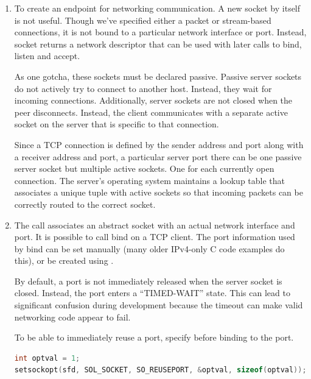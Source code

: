 \begin{enumerate}

  \item {}

  To create an endpoint for networking communication.
  A new socket by itself is not useful.
  Though we've specified either a packet or stream-based connections, it is not bound to a particular network interface or port.
  Instead, socket returns a network descriptor that can be used with later calls to bind, listen and accept.

  As one gotcha, these sockets must be declared passive.
  Passive server sockets do not actively try to connect to another host.
  Instead, they wait for incoming connections.
  Additionally, server sockets are not closed when the peer disconnects.
  Instead, the client communicates with a separate active socket on the server that is specific to that connection.

  Since a TCP connection is defined by the sender address and port along with a receiver address and port, a particular server port there can be one passive server socket but multiple active sockets.
  One for each currently open connection.
  The server's operating system maintains a lookup table that associates a unique tuple with active sockets so that incoming packets can be correctly routed to the correct socket.

  \item {}

  The  call associates an abstract socket with an actual network interface and port.
  It is possible to call bind on a TCP client.
  The port information used by bind can be set manually (many older IPv4-only C code examples do this), or be created using .

  By default, a port is not immediately released when the server socket is closed.
  Instead, the port enters a ``TIMED-WAIT'' state.
  This can lead to significant confusion during development because the timeout can make valid networking code appear to fail.

  To be able to immediately reuse a port, specify  before binding to the port.

  \begin{lstlisting}[language=C]
int optval = 1;
setsockopt(sfd, SOL_SOCKET, SO_REUSEPORT, &optval, sizeof(optval));


\end{lstlisting}
\end{enumerate}
